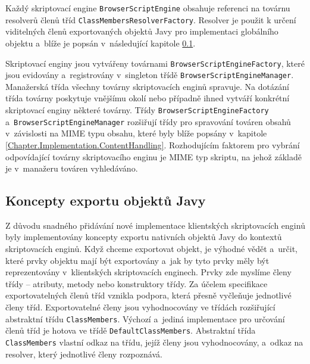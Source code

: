 Každý skriptovací engine \texttt{BrowserScriptEngine} obsahuje referenci na továrnu resolverů členů tříd \texttt{ClassMembersResolverFactory}. Resolver je použit k určení viditelných členů exportovaných objektů Javy pro implementaci globálního objektu a~blíže je popsán v~následující kapitole \ref{Chapter.Implementation.ExportConcepts}. 

Skriptovací enginy jsou vytvářeny továrnami \texttt{BrowserScriptEngineFactory}, které jsou evidovány a~registrovány v~singleton třídě \texttt{BrowserScriptEngineManager}. Manažerská třída všechny továrny skriptovacích enginů spravuje. Na dotázání třída továrny poskytuje vnějšímu okolí nebo případně ihned vytváří konkrétní skriptovací enginy některé továrny. Třídy \texttt{BrowserScriptEngineFactory} a~\texttt{BrowserScriptEngineManager} rozšiřují třídy pro spravování továren obsahů v~závislosti na MIME typu obsahu, které byly blíže popsány v~kapitole \ref{Chapter.Implementation.ContentHandling}. Rozhodujícím faktorem pro vybrání odpovídající továrny skriptovacího enginu je MIME typ skriptu, na jehož základě je v~manažeru továren vyhledáváno.

\subsection{Koncepty exportu objektů Javy}
\label{Chapter.Implementation.ExportConcepts}

Z důvodu snadného přidávání nové implementace klientských skriptovacích enginů byly implementovány koncepty exportu nativních objektů Javy do kontextů skriptovacích enginů. Když chceme exportovat objekt, je výhodné vědět a~určit, které prvky objektu mají být exportovány a~jak by tyto prvky měly být reprezentovány v~klientských skriptovacích enginech. Prvky zde myslíme členy třídy -- atributy, metody nebo konstruktory třídy. Za účelem specifikace exportovatelných členů tříd vznikla podpora, která přesně vyčleňuje jednotlivé členy tříd. Exportovatelné členy jsou vyhodnocovány ve třídách rozšiřující abstraktní třídu \texttt{ClassMembers}. Výchozí a~jediná implementace pro určování členů tříd je hotova ve třídě \texttt{DefaultClassMembers}. Abstraktní třída \texttt{ClassMembers} vlastní odkaz na třídu, jejíž členy jsou vyhodnocovány, a~odkaz na resolver, který jednotlivé členy rozpoznává. 

